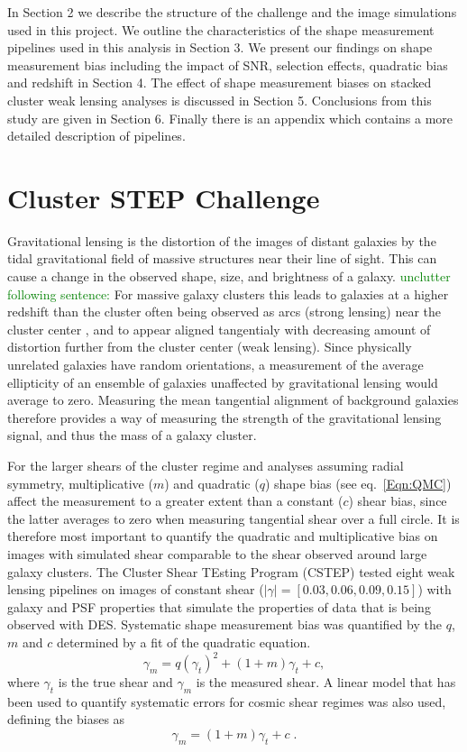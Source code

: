 \documentclass[useAMS,usenatbib]{mn2e}
\newcommand{\green}[1]{\textcolor{green}{#1}}
\begin{document}
In Section 2 we describe the structure of the challenge and the image simulations used in this
project. We outline the characteristics of the shape
measurement pipelines used in this analysis in Section 3. We present
our findings on shape measurement bias including the impact of SNR, selection
effects, quadratic bias and redshift in Section 4. The
effect of shape measurement biases on stacked cluster weak lensing
analyses is discussed in Section 5.  Conclusions from this study are 
given in Section 6.  Finally there is an appendix which contains a more detailed
description of pipelines. 



\section{Cluster STEP Challenge}
Gravitational lensing is the distortion of the images of
distant galaxies by the tidal gravitational field of massive structures near
their line of sight. This can
cause a change in the observed shape, size, and brightness of a
galaxy. \green{unclutter following sentence:} For massive galaxy clusters this leads to galaxies at a
higher redshift than the cluster often being
observed as arcs (strong lensing) near the cluster center , and to
appear aligned tangentialy with decreasing amount of distortion further from
the cluster center (weak lensing). Since physically unrelated galaxies 
have random orientations, a measurement of the average ellipticity of
an ensemble of galaxies unaffected by gravitational lensing would average
to zero. Measuring the mean tangential alignment of background galaxies therefore provides a way of
measuring the strength of the gravitational lensing signal, and thus the
mass of a galaxy cluster. 

For the larger shears of the cluster regime and analyses assuming radial symmetry, multiplicative ($m$) and
quadratic ($q$) shape bias (see eq.~\ref{Eqn:QMC})
affect the measurement to a greater extent than a
constant ($c$) shear bias, since the latter averages to zero when measuring
tangential shear over a full circle. It is therefore most
important to quantify the quadratic and multiplicative bias on images
with simulated shear comparable to the shear observed around large
galaxy clusters. The Cluster Shear TEsting Program (CSTEP) tested eight weak lensing pipelines on images of constant shear
($|\gamma| = [0.03, 0.06, 0.09, 0.15]$) with galaxy and PSF properties that simulate the properties
of data that is being observed with DES. Systematic shape measurement bias was quantified by the $q$, $m$ and $c$
determined by a fit of the quadratic equation.
\begin{equation}\label{Eqn:QMC}
\gamma_m = q (\gamma_t)^2 + (1+m) \gamma_t + c,
\end {equation}
where $\gamma_t$ is the true shear and $\gamma_m$ is the measured
shear. A linear model that has been used to quantify systematic errors
for cosmic shear regimes was also used, defining the biases as \citep{STEP1}
\begin{equation}\label{Eqn:MC}
\gamma_m = (1+m) \gamma_t + c \; .
\end {equation}
\end{document}
